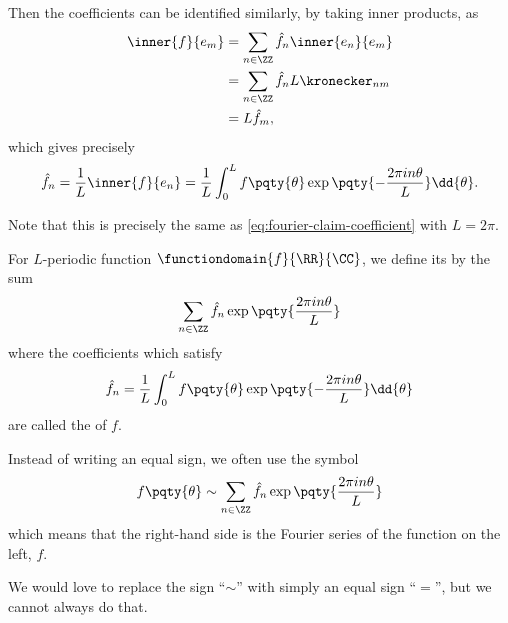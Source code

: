 Then the coefficients can be identified similarly, by taking inner products, as
\begin{subequations}
    \begin{align}
        \inner{f}{e_m} &= \sum_{n \in \ZZ} \hat{f}_n \inner{e_n}{e_m} \\
        &= \sum_{n \in \ZZ} \hat{f}_n L \kronecker_{nm} \\
        &= L \hat{f}_m,
    \end{align}
\end{subequations}
which gives precisely
\begin{equation}
    \hat{f}_n = \frac{1}{L} \inner{f}{e_n} = \frac{1}{L} \int_{0}^{L} f\pqty{\theta} \exp\pqty{- \frac{2 \pi i n \theta}{L}} \dd{\theta}.
\end{equation}

Note that this is precisely the same as \eqref{eq:fourier-claim-coefficient} with \(L = 2 \pi\).

\begin{definition}
    For \(L\)-periodic function \(\functiondomain{f}{\RR}{\CC}\), we define its  by the sum
    \begin{equation}
        \sum_{n \in \ZZ} \hat{f}_n \exp\pqty{\frac{2 \pi i n \theta}{L}}
    \end{equation}
    where the coefficients which satisfy
    \begin{equation}
        \label{eq:fourier-coefficient-definition}%
        \hat{f}_n = \frac{1}{L} \int_{0}^{L} f\pqty{\theta} \exp\pqty{- \frac{2 \pi i n \theta}{L}} \dd{\theta}
    \end{equation}
    are called the  of \(f\).

    Instead of writing an equal sign, we often use the symbol
    \begin{equation}
        \label{eq:forier-series-notation-sim}%
        f\pqty{\theta} \sim \sum_{n \in \ZZ} \hat{f}_n \exp\pqty{\frac{2 \pi i n \theta}{L}}
    \end{equation}
    which means that the right-hand side is the Fourier series of the function on the left, \(f\).
\end{definition}

We would love to replace the sign ``\(\sim\)'' with simply an equal sign ``\(=\)'', but we cannot always do that.

